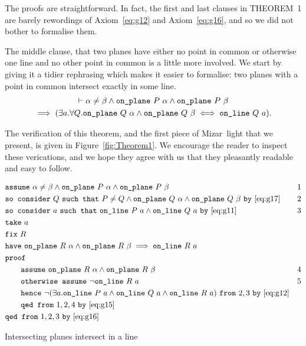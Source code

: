 The proofs are straightforward. In fact, the first and last clauses in THEOREM~1 are barely rewordings of Axiom~\ref{eq:g12} and Axiom~\ref{eq:g16}, and so we did not bother to formalise them.

The middle clause, that two planes have either no point in common or otherwise one line and no other point in common is a little more involved. We start by giving it a tidier rephrasing which makes it easier to formalise: two planes with a point in common intersect exactly in some line.
\begin{multline}
  \vdash \alpha \neq \beta \wedge \texttt{on\_plane}\ P\ \alpha \wedge \texttt{on\_plane}\ P\ \beta\\
  \implies (\exists a. \forall Q. \texttt{on\_plane}\ Q\ \alpha \wedge \texttt{on\_plane}\ Q\ \beta \iff \texttt{on\_line}\ Q\ a).
\end{multline}

The verification of this theorem, and the first piece of Mizar~light that we present, is given in Figure~\ref{fig:Theorem1}. We encourage the reader to inspect these verications, and we hope they agree with us that they pleasantly readable and easy to follow. 

\begin{boxedfigure}
\small
  \begin{align*}
    &\code{assume}\ \alpha\neq\beta \wedge \code{on\_plane}\ P\ \alpha\wedge\code{on\_plane}\ P\ \beta & 1\\
    &\code{so consider}\ Q\ \code{such that}\ P\neq Q \wedge\code{on\_plane}\ Q\ \alpha \wedge\code{on\_plane}\ Q\ \beta\ \code{by}\ \eqref{eq:g17} & 2\\
    &\code{so consider}\ a\ \code{such that}\ \code{on\_line}\ P\ a\wedge\code{on\_line}\ Q\ a\ \code{by}\ \eqref{eq:g11} & 3\\
    &\code{take}\ a\\
    &\code{fix}\ R\\
    &\code{have}\ \code{on\_plane}\ R\ \alpha\wedge\code{on\_plane}\ R\ \beta \implies \code{on\_line}\ R\ a\\
    &\code{proof}\\
    &\qquad\code{assume}\ \code{on\_plane}\ R\ \alpha\wedge\code{on\_plane}\ R\ \beta & 4\\
    &\qquad\code{otherwise assume}\ \neg\code{on\_line}\ R\ a & 5\\
    &\qquad\code{hence}\ \Triangle{a}{P}{Q}{R}\ \code{from}\ 2,3\ \code{by}\ \eqref{eq:g12}\\
    &\qquad\code{qed from}\ 1,2,4\ \code{by}\ \eqref{eq:g15}\\
    &\code{qed from}\ 1,2,3\ \code{by}\ \eqref{eq:g16}
  \end{align*}
  \caption{Intersecting planes intersect in a line}
  \label{fig:Theorem1}
\end{boxedfigure}

